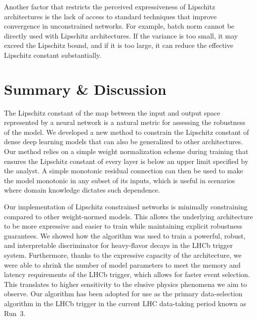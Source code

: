 \documentclass{article}
\begin{document}
Another factor that restricts the perceived expressiveness of Lipschitz architectures is the lack of access to standard techniques that improve convergence in unconstrained networks. For example, batch norm cannot be directly used with Lipschitz architectures. If the variance is too small, it may exceed the Lipschitz bound, and if it is too large, it can reduce the effective Lipschitz constant substantially.





\section{Summary \& Discussion}

The Lipschitz constant of the map between the input and output space represented by a neural network is a natural metric for assessing the robustness of the model. 
We developed a new method to constrain the Lipschitz constant of dense deep learning models that can also be generalized to other architectures. Our method relies on a simple weight normalization scheme during training that ensures the Lipschitz constant of every layer is below an upper limit specified by the analyst.
A simple monotonic residual connection can then be used to make the model monotonic in any subset of its inputs, which is useful in scenarios where domain knowledge dictates such dependence.

Our implementation of Lipschitz constrained networks is minimally constraining compared
to other weight-normed models. 
This allows the underlying architecture to be more
expressive and easier to train while maintaining explicit robustness guarantees.
We showed how the algorithm was used to train a powerful, robust, and interpretable discriminator for heavy-flavor decays in the LHCb trigger system. 
Furthermore, thanks to the expressive capacity of the architecture, we were able to shrink the
number of model parameters to meet the memory and latency requirements of the LHCb trigger, which allows for faster event selection. 
This translates to higher sensitivity
to the elusive physics phenomena we aim to observe. 
Our algorithm has been adopted for use as the primary data-selection algorithm in the LHCb trigger in the current LHC data-taking period known as Run~3.
\end{document}
